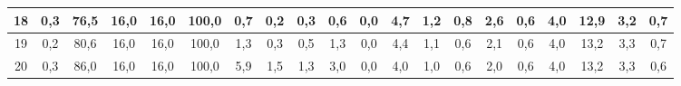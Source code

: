 \begin{sidewaystable}[]
\begin{tabular}{|c|c|c|c|c|c|c|c|c|c|c|c|c|c|c|c|c|c|c|c|}
    18 & 0,3                                              & 76,5                                            & 16,0                                            & 16,0                                            & 100,0                                           & 0,7                                             & 0,2                                             & 0,3                                             & 0,6                                             & 0,0                                             & 4,7                                              & 1,2                                              & 0,8                                              & 2,6                                              & 0,6                                              & 4,0                                              & 12,9                                             & 3,2                                              & 0,7                                              \\ \hline
    19 & 0,2                                              & 80,6                                            & 16,0                                            & 16,0                                            & 100,0                                           & 1,3                                             & 0,3                                             & 0,5                                             & 1,3                                             & 0,0                                             & 4,4                                              & 1,1                                              & 0,6                                              & 2,1                                              & 0,6                                              & 4,0                                              & 13,2                                             & 3,3                                              & 0,7                                              \\ \hline
    20 & 0,3                                              & 86,0                                            & 16,0                                            & 16,0                                            & 100,0                                           & 5,9                                             & 1,5                                             & 1,3                                             & 3,0                                             & 0,0                                             & 4,0                                              & 1,0                                              & 0,6                                              & 2,0                                              & 0,6                                              & 4,0                                              & 13,2                                             & 3,3                                              & 0,6                                              \\ \hline

\end{tabular}
\end{sidewaystable}
